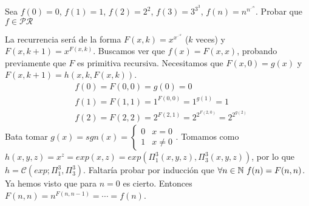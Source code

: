 \documentclass[twoside]{article}
\begin{document}
\begin{ejercicio}{7}
Sea $f(0)=0$, $f(1)=1$, $f(2)=2^2$, $f(3)=3^{3^3}$, $f(n)= n^{n^{\iddots^n}}$. Probar que $f\in\mathcal{PR}$
\end{ejercicio}
\begin{solucion}
La recurrencia será de la forma $F(x,k)=x^{x^{\iddots^x}}$ ($k$ veces) y $F(x,k+1)=x^{F(x,k)}$. Buscamos ver que $f(x)=F(x,x)$, probando previamente que $F$ es primitiva recursiva. Necesitamos que $F(x,0)=g(x)$ y $F(x,k+1)=h(x,k,F(x,k))$. 
\begin{align*}
&f(0)=F(0,0)=g(0)=0\\
&f(1)=F(1,1)=1^{F(0,0)}=1^{g(1)}=1\\
&f(2)=F(2,2)=2^{F(2,1)}=2^{2^{F(2,0)}}=2^{2^{g(2)}}
\end{align*}
Bata tomar $g(x)=sgn(x)=\begin{cases}
0 & x=0\\
1 & x\neq 0
\end{cases}$. Tomamos como $h(x,y,z)=x^z=exp(x,z)=exp(\Pi^3_1(x,y,z),\Pi^3_3(x,y,z))$, por lo que $h=\mathcal{C}(exp; \Pi^3_1,\Pi^3_3)$. Faltaría probar por inducción que $\forall n\in\mathbb{N}\ f(n)=F(n,n)$. Ya hemos visto que para $n=0$ es cierto. Entonces $F(n,n)=n^{F(n,n-1)}=\cdots = f(n)$. 
\end{solucion}

\newpage
\end{document}
